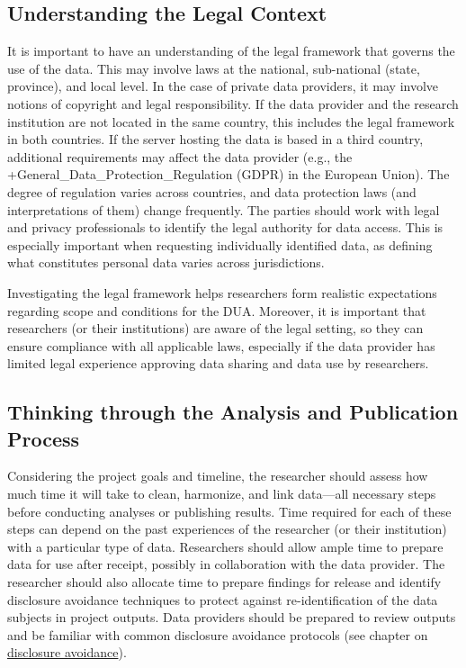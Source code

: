 \documentclass[
]{book}
\begin{document}
\hypertarget{understanding-the-legal-context}{%
\subsection{Understanding the Legal Context}\label{understanding-the-legal-context}}

It is important to have an understanding of the legal framework that governs the use of the data. This may involve laws at the national, sub-national (state, province), and local level. In the case of private data providers, it may involve notions of copyright and legal responsibility. If the data provider and the research institution are not located in the same country, this includes the legal framework in both countries. If the server hosting the data is based in a third country, additional requirements may affect the data provider (e.g., the +General\_Data\_Protection\_Regulation\textbar{} (GDPR) in the European Union). The degree of regulation varies across countries, and data protection laws (and interpretations of them) change frequently. The parties should work with legal and privacy professionals to identify the legal authority for data access. This is especially important when requesting individually identified data, as defining what constitutes personal data varies across jurisdictions.

Investigating the legal framework helps researchers form realistic expectations regarding scope and conditions for the DUA. Moreover, it is important that researchers (or their institutions) are aware of the legal setting, so they can ensure compliance with all applicable laws, especially if the data provider has limited legal experience approving data sharing and data use by researchers.

\hypertarget{thinking-through-the-analysis-and-publication-process}{%
\subsection{Thinking through the Analysis and Publication Process}\label{thinking-through-the-analysis-and-publication-process}}

Considering the project goals and timeline, the researcher should assess how much time it will take to clean, harmonize, and link data---all necessary steps before conducting analyses or publishing results. Time required for each of these steps can depend on the past experiences of the researcher (or their institution) with a particular type of data. Researchers should allow ample time to prepare data for use after receipt, possibly in collaboration with the data provider. The researcher should also allocate time to prepare findings for release and identify disclosure avoidance techniques to protect against re-identification of the data subjects in project outputs. Data providers should be prepared to review outputs and be familiar with common disclosure avoidance protocols (see chapter on \protect\hyperlink{discavoid}{disclosure avoidance}).
\end{document}
